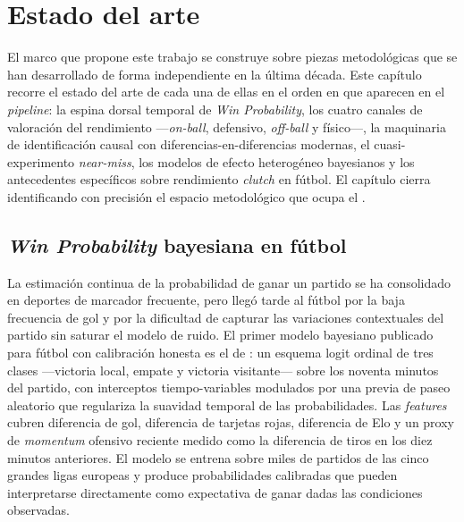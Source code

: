 \chapter{Estado del arte}
\label{ch:estado-arte}

El marco que propone este trabajo se construye sobre piezas metodológicas
que se han desarrollado de forma independiente en la última década. Este capítulo
recorre el estado del arte de cada una de ellas en el orden en que
aparecen en el \textit{pipeline}: la espina dorsal temporal de
\textit{Win Probability}, los cuatro canales de valoración del
rendimiento ---\textit{on-ball}, defensivo, \textit{off-ball} y
físico---, la maquinaria de identificación causal con
diferencias-en-diferencias modernas, el cuasi-experimento
\textit{near-miss}, los modelos de efecto heterogéneo bayesianos y los
antecedentes específicos sobre rendimiento \textit{clutch} en fútbol.
El capítulo cierra identificando con precisión el espacio metodológico
que ocupa el \CCV.


\section{\textit{Win Probability} bayesiana en fútbol}
\label{sec:sota-wp}

La estimación continua de la probabilidad de ganar un partido se ha
consolidado en deportes de marcador frecuente, pero llegó tarde al
fútbol por la baja frecuencia de gol y por la dificultad de capturar
las variaciones contextuales del partido sin saturar el modelo de
ruido. El primer modelo bayesiano publicado para fútbol con calibración
honesta es el de \textcite{Robberechts2021WP}: un esquema logit ordinal
de tres clases ---victoria local, empate y victoria visitante--- sobre
los noventa minutos del partido, con interceptos tiempo-variables
modulados por una previa de paseo aleatorio que regulariza la suavidad
temporal de las probabilidades. Las \textit{features} cubren diferencia
de gol, diferencia de tarjetas rojas, diferencia de Elo y un proxy de
\textit{momentum} ofensivo reciente medido como la diferencia de tiros
en los diez minutos anteriores. El modelo se entrena sobre miles de
partidos de las cinco grandes ligas europeas y produce probabilidades
calibradas que pueden interpretarse directamente como expectativa de
ganar dadas las condiciones observadas.

